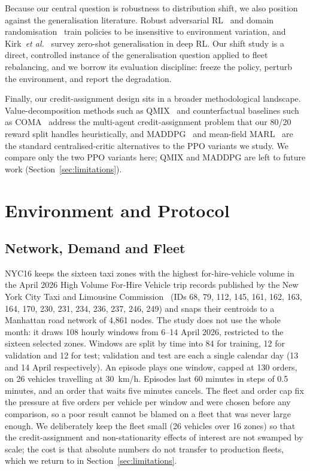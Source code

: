 \documentclass[conference]{IEEEtran}
\begin{document}
Because our central question is robustness to distribution shift, we also
position against the generalisation literature. Robust adversarial
RL~\cite{pinto2017} and domain randomisation~\cite{tobin2017} train policies
to be insensitive to environment variation, and Kirk~\emph{et
al.}~\cite{kirk2023} survey zero-shot generalisation in deep RL. Our shift
study is a direct, controlled instance of the generalisation question applied
to fleet rebalancing, and we borrow its evaluation discipline: freeze the
policy, perturb the environment, and report the degradation.

Finally, our credit-assignment design sits in a broader methodological
landscape. Value-decomposition methods such as QMIX~\cite{rashid2018} and
counterfactual baselines such as COMA~\cite{foerster2018} address the
multi-agent credit-assignment problem that our 80/20 reward split handles
heuristically, and MADDPG~\cite{lowe2017} and mean-field
MARL~\cite{yang2018} are the standard centralised-critic alternatives to the
PPO variants we study. We compare only the two PPO variants here; QMIX and
MADDPG are left to future work (Section~\ref{sec:limitations}).

\section{Environment and Protocol}
\label{sec:env}

\subsection{Network, Demand and Fleet}
\label{sec:network}

NYC16 keeps the sixteen taxi zones with the highest for-hire-vehicle volume in
the April 2026 High Volume For-Hire Vehicle trip records published by the New
York City Taxi and Limousine Commission~\cite{tlc_fhvhv_2026} (IDs 68, 79,
112, 145, 161, 162, 163, 164, 170, 230, 231, 234, 236, 237, 246, 249) and
snaps their centroids to a Manhattan road network of 4{,}861 nodes. The study
does not use the whole month: it draws 108 hourly windows from 6--14 April
2026, restricted to the sixteen selected zones. Windows are split by time into
84 for training, 12 for validation and 12 for test; validation and test are
each a single calendar day (13 and 14 April respectively). An episode plays one
window, capped at 130 orders, on 26 vehicles travelling at 30~km/h. Episodes
last 60 minutes in steps of 0.5 minutes, and an order that waits five minutes
cancels. The fleet and order cap fix the pressure at five orders per vehicle
per window and were chosen before any comparison, so a poor result cannot be
blamed on a fleet that was never large enough. We deliberately keep the fleet
small (26 vehicles over 16 zones) so that the credit-assignment and
non-stationarity effects of interest are not swamped by scale; the cost is
that absolute numbers do not transfer to production fleets, which we return to
in Section~\ref{sec:limitations}.
\end{document}
